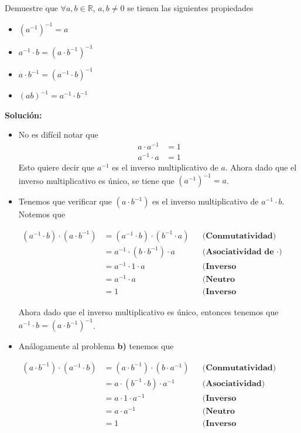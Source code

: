 \documentclass[12pt]{book}
\begin{document}
\begin{prob}
\quad \quad 
    Demuestre que $\forall a, b \in \mathbb{R}$, $a,b \neq 0$ se tienen las siguientes propiedades

    \begin{itemize}
        \item[\textbf{a)}] $(a^{-1})^{-1}=a$
        \item[\textbf{b)}] $a^{-1} \cdot b = ( a \cdot b^{-1})^{-1}$
        \item[\textbf{c)}] $a \cdot b^{-1} = (a^{-1} \cdot b)^{-1}$ 
        \item[\textbf{d)}] $(ab)^{-1}=a^{-1} \cdot b^{-1}$
    \end{itemize}
\end{prob}
\textbf{Solución:}

\begin{itemize}
    \item[\textbf{a)}]   No es difícil notar que 
\begin{align*}
    a \cdot a^{-1}&=1 \\
    a^{-1} \cdot a&=1
\end{align*}
Esto quiere decir que $a^{-1}$ es el inverso multiplicativo de $a$. Ahora dado que el inverso multiplicativo es único, se tiene que  $(a^{-1})^{-1}=a$.
\item[\textbf{b)}] Tenemos que verificar que $( a \cdot b^{-1})$ es el inverso multiplicativo de $a^{-1}\cdot b$. Notemos que 

\begin{align*}
    (a^{-1}\cdot b) \cdot (a \cdot b^{-1}) &=   (a^{-1}\cdot b) \cdot ( b^{-1}\cdot a ) && \textbf{(Conmutatividad)} \\
    &=  a^{-1} \cdot (b \cdot b^{-1}) \cdot a  && \textbf{(Asociatividad de $\cdot$)} \\
    &=  a^{-1} \cdot 1 \cdot a && \textbf{(Inverso Multiplicativo)} \\
    &= a^{-1} \cdot a && \textbf{(Neutro Multiplicativo)} \\
    &= 1 && \textbf{(Inverso Multiplicativo)}
\end{align*}

Ahora dado que el inverso multiplicativo es único, entonces tenemos que $a^{-1}\cdot b= (a \cdot b^{-1})^{-1}$.
\item[\textbf{c)}] Análogamente al problema \textbf{b)} tenemos que 

\begin{align*}
    (a\cdot b^{-1}) \cdot (a^{-1}\cdot b) &= (a\cdot b^{-1}) \cdot (b \cdot a^{-1}) && \textbf{(Conmutatividad)} \\
    &= a \cdot ( b^{-1} \cdot b) \cdot a^{-1} && \textbf{(Asociatividad)} \\
    &= a \cdot 1 \cdot a^{-1} && \textbf{(Inverso Multiplicativo)} \\
    &= a \cdot a^{-1} && \textbf{(Neutro Multiplicativo)} \\
    &= 1 && \textbf{(Inverso Multiplicativo)}
\end{align*}


\end{itemize}
\end{document}
